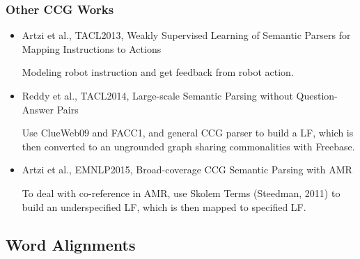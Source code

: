 \documentclass{beamer}
\begin{document}
\begin{frame}
    \frametitle{Other CCG Works}
    \begin{itemize}
        \item Artzi et al., TACL2013, Weakly Supervised Learning of Semantic Parsers
            for Mapping Instructions to Actions

            Modeling robot instruction and get feedback from robot action.

        \item Reddy et al., TACL2014, Large-scale Semantic Parsing without Question-Answer Pairs

            Use ClueWeb09 and FACC1, and general CCG parser to build a LF,
            which is then converted to an ungrounded graph sharing commonalities with Freebase.

        \item Artzi et al., EMNLP2015, Broad-coverage CCG Semantic Parsing with AMR

            To deal with co-reference in AMR, use Skolem Terms (Steedman, 2011) to build
            an underspecified LF, which is then mapped to specified LF.

    \end{itemize}
\end{frame}

\subsection{Word Alignments}
\end{document}
